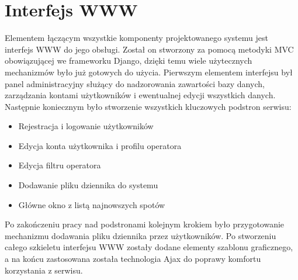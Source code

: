 \documentclass[]{mgr}
\begin{document}
        \section{Interfejs WWW}
        Elementem łączącym wszystkie komponenty projektowanego systemu jest interfejs WWW do jego obsługi. Został on stworzony za pomocą metodyki MVC obowiązującej we frameworku Django, dzięki temu wiele użytecznych mechanizmów było już gotowych do użycia. Pierwszym elementem interfejsu był panel administracyjny służący do nadzorowania zawartości bazy danych, zarządzania kontami użytkowników i ewentualnej edycji wszystkich danych. Następnie koniecznym było stworzenie wszystkich kluczowych podstron serwisu:
        \begin{itemize}
            \item Rejestracja i logowanie użytkowników
            \item Edycja konta użytkownika i profilu operatora
            \item Edycja filtru operatora
            \item Dodawanie pliku dziennika do systemu
            \item Główne okno z listą najnowszych spotów
        \end{itemize}
        Po zakończeniu pracy nad podstronami kolejnym krokiem było przygotowanie mechanizmu dodawania pliku dziennika przez użytkowników. Po stworzeniu całego szkieletu interfejsu WWW zostały dodane elementy szablonu graficznego, a na końcu zastosowana została technologia Ajax do poprawy komfortu korzystania z serwisu.
\end{document}
